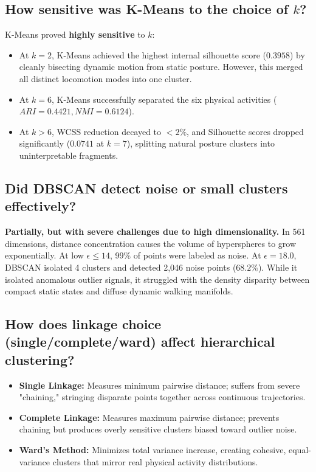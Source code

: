 \documentclass[12pt,a4paper]{article}
\begin{document}
\subsection{How sensitive was K-Means to the choice of $k$?}
K-Means proved \textbf{highly sensitive} to $k$:
\begin{itemize}
\item At $k=2$, K-Means achieved the highest internal silhouette score ($0.3958$) by cleanly bisecting dynamic motion from static posture. However, this merged all distinct locomotion modes into one cluster.
\item At $k=6$, K-Means successfully separated the six physical activities ($ARI = 0.4421, NMI = 0.6124$).
\item At $k > 6$, WCSS reduction decayed to $<2\%$, and Silhouette scores dropped significantly ($0.0741$ at $k=7$), splitting natural posture clusters into uninterpretable fragments.
\end{itemize}

\subsection{Did DBSCAN detect noise or small clusters effectively?}
\textbf{Partially, but with severe challenges due to high dimensionality.}
In 561 dimensions, distance concentration causes the volume of hyperspheres to grow exponentially. At low $\epsilon \le 14$, 99\% of points were labeled as noise. At $\epsilon = 18.0$, DBSCAN isolated 4 clusters and detected 2,046 noise points ($68.2\%$). While it isolated anomalous outlier signals, it struggled with the density disparity between compact static states and diffuse dynamic walking manifolds.

\subsection{How does linkage choice (single/complete/ward) affect hierarchical clustering?}
\begin{itemize}
\item \textbf{Single Linkage:} Measures minimum pairwise distance; suffers from severe "chaining," stringing disparate points together across continuous trajectories.
\item \textbf{Complete Linkage:} Measures maximum pairwise distance; prevents chaining but produces overly sensitive clusters biased toward outlier noise.
\item \textbf{Ward's Method:} Minimizes total variance increase, creating cohesive, equal-variance clusters that mirror real physical activity distributions.
\end{itemize}
\end{document}
